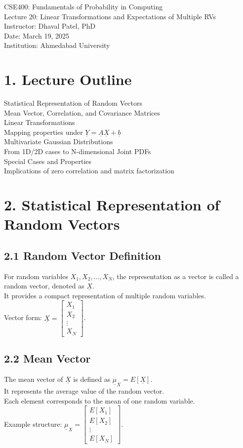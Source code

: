 \documentclass[12pt]{article}
\begin{document}
\noindent
CSE400: Fundamentals of Probability in Computing \\
Lecture 20: Linear Transformations and Expectations of Multiple RVs \\
Instructor: Dhaval Patel, PhD \\
Date: March 19, 2025 \\
Institution: Ahmedabad University 

\section*{1. Lecture Outline}
Statistical Representation of Random Vectors \\
Mean Vector, Correlation, and Covariance Matrices \\
Linear Transformations \\
Mapping properties under $\underline{Y}=\underline{A}\underline{X}+\underline{b}$ \\
Multivariate Gaussian Distributions \\
From 1D/2D cases to N-dimensional Joint PDFs \\
Special Cases and Properties \\
Implications of zero correlation and matrix factorization 

\section*{2. Statistical Representation of Random Vectors}
\subsection*{2.1 Random Vector Definition}
For random variables $X_{1}, X_{2}, \dots, X_{N}$, the representation as a vector is called a random vector, denoted as $\underline{X}$. \\
It provides a compact representation of multiple random variables. \\
Vector form: $\underline{X} = \begin{bmatrix} X_{1} \\ X_{2} \\ \vdots \\ X_{N} \end{bmatrix}$.

\subsection*{2.2 Mean Vector}
The mean vector of $\underline{X}$ is defined as $\underline{\mu}_{X}=E[\underline{X}]$. \\
It represents the average value of the random vector. \\
Each element corresponds to the mean of one random variable. \\
Example structure: $\underline{\mu}_{X} = \begin{bmatrix} E[X_{1}] \\ E[X_{2}] \\ \vdots \\ E[X_{N}] \end{bmatrix}$.
\end{document}
